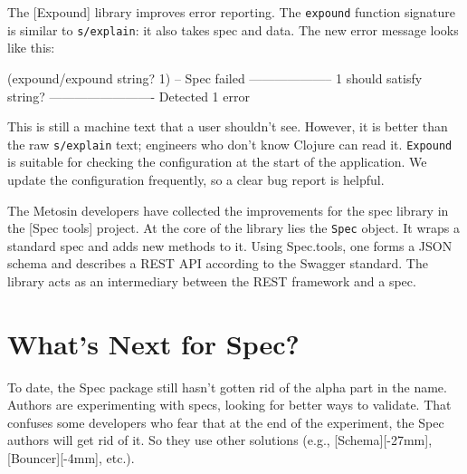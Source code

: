 
The [Expound] library improves error reporting. The \verb|expound| function signature is similar to \verb|s/explain|: it also takes spec and data. The new error message looks like this:


\begin{english}
  \begin{clojure}
(expound/expound string? 1)
-- Spec failed --------------------
  1
should satisfy
  string?
-------------------------
Detected 1 error
  \end{clojure}
\end{english}


This is still a machine text that a user shouldn't see. However, it is better than the raw \verb|s/explain| text; engineers who don't know Clojure can read it. \verb|Expound| is suitable for checking the configuration at the start of the application. We update the configuration frequently, so a clear bug report is helpful.


The Metosin developers have collected the improvements for the spec library in the [Spec tools] project. At the core of the library lies the \verb|Spec| object. It wraps a standard spec and adds new methods to it. Using Spec.tools, one forms a JSON schema and describes a REST API according to the Swagger standard. The library acts as an intermediary between the REST framework and a spec.

\section{What's Next for Spec?}


To date, the Spec package still hasn't gotten rid of the alpha part in the name. Authors are experimenting with specs, looking for better ways to validate. That confuses some developers who fear that at the end of the experiment, the Spec authors will get rid of it. So they use other solutions (e.g., [Schema][-27mm],
[Bouncer][-4mm], etc.).

